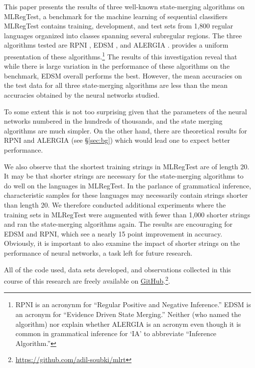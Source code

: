\documentclass[twoside,11pt]{article}
\newcommand{\repo}{https://github.com/adil-soubki/mlrt}
\begin{document}
This paper presents the results of three well-known state-merging algorithms on MLRegTest, a benchmark for the machine learning of sequential classifiers \citep{heinz-etal-2022-mlregtest}
MLRegTest contains training, development, and test sets from 1,800 regular languages organized into classes spanning several subregular regions.
The three algorithms tested are RPNI \citep{rpni-1992}, EDSM \citep{Lang1998}, and ALERGIA \citep{CarrascoOncina1994,carr99}. \citet{Higuera2010} provides a uniform presentation of these algorithms.\footnote{RPNI is an acronynm for ``Regular Positive and Negative Inference.''
EDSM is an acronym for ``Evidence Driven State Merging.'' Neither \citet{CarrascoOncina1994} (who named the algorithm) nor \citet{Higuera2010} explain whether ALERGIA is an acronym even though it is common in grammatical inference for `IA' to abbreviate ``Inference Algorithm.''}
The results of this investigation reveal that while there is large variation in the performance of these algorithms on the benchmark, EDSM overall performs the best.
However, the mean accuracies on the test data for all three state-merging algorithms are less than the mean accuracies obtained by the neural networks \citet{heinz-etal-2022-mlregtest} studied.

To some extent this is not too surprising given that the parameters of the neural networks numbered in the hundreds of thousands, and the state merging algorithms are much simpler. On the other hand, there are theoretical results for RPNI and ALERGIA (see \S\ref{sec:bg}) which would lead one to expect better performance.

We also observe that the shortest training strings in MLRegTest are of length 20. It may be that shorter strings are necessary for the state-merging algorithms to do well on the languages in MLRegTest. In the parlance of grammatical inference, characteristic samples for these languages may necessarily contain strings shorter than length 20. We therefore conducted additional experiments where the training sets in MLRegTest were augmented with fewer than 1,000 shorter strings and ran the state-merging algorithms again. The results are encouraging for EDSM and RPNI, which see a nearly 15 point improvement in accuracy. 
Obviously, it is important to also examine the impact of shorter strings on the performance of neural networks, a task left for future research.

All of the code used, data sets developed, and observations collected in this course of this research are freely available on \href{\repo}{GitHub}.\footnote{\href{\repo}{\repo}}.
\end{document}
